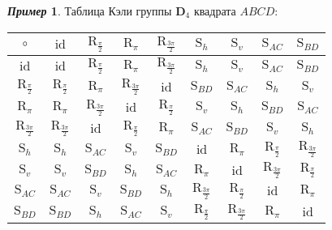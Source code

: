 \documentclass[a4paper, 14pt]{extarticle}
\newcommand{\n}{\par}
\newcommand{\dihedral}{\mathbf{D}}
\newcommand{\id}{\mathrm{id}}
\newcommand{\Rot}{\mathrm{R}}
\newcommand{\Sym}{\mathrm{S}}
\theoremstyle{definition}
\newtheorem*{exmpl*}{\textit{Пример}}
\theoremstyle{plain}
\numberwithin{theorem}{section}
\numberwithin{definition}{section}
\numberwithin{statement}{section}
\numberwithin{lemma}{section}
\numberwithin{consequence}{section}
\begin{document}
	\begin{exmpl*}
		Таблица Кэли группы $\dihedral_4$ квадрата $ABCD{:}$
		\begin{center}
			\begin{tabular}{c|c|c|c|c|c|c|c|c}
				$\circ$ & $\id$ & $\Rot_{\frac{\pi}{2}}$ & $\Rot_{\pi}$ & $\Rot_{\frac{3\pi}{2}}$ & 
				$\Sym_h$ &
				$\Sym_v$ &
				$\Sym_{AC}$ &
				$\Sym_{BD}$ \\
				\hline
				$\id$ & $\id$ & $\Rot_{\frac{\pi}{2}}$ & $\Rot_{\pi}$ & $\Rot_{\frac{3\pi}{2}}$ & 
				$\Sym_h$ &
				$\Sym_v$ &
				$\Sym_{AC}$ &
				$\Sym_{BD}$ \\
				\hline
				$\Rot_{\frac{\pi}{2}}$ & $\Rot_{\frac{\pi}{2}}$ & $\Rot_{\pi}$ & $\Rot_\frac{3\pi}{2}$ & $\id$ & $\Sym_{BD}$ & $\Sym_{AC}$ & $\Sym_h$ & $\Sym_v$ \\
				\hline
				$\Rot_{\pi}$ & $\Rot_{\pi}$ & $\Rot_\frac{3\pi}{2}$ & $\id$ & $\Rot_\frac{\pi}{2}$ & $\Sym_v$ & $\Sym_h$ & $\Sym_{BD}$ & $\Sym_{AC}$ \\ \hline
				$\Rot_\frac{3\pi}{2}$ & $\Rot_\frac{3\pi}{2}$ & $\id$ & $\Rot_\frac{\pi}{2}$ & $\Rot_{\pi}$ & $\Sym_{AC}$ & $\Sym_{BD}$ & $\Sym_v$ & $\Sym_h$ \\
				\hline
				$\Sym_h$ & $\Sym_h$ & $\Sym_{AC}$ & $\Sym_v$ & $\Sym_{BD}$ & $\id$ & $\Rot_{\pi}$ & $\Rot_\frac{\pi}{2}$ & $\Rot_\frac{3\pi}{2}$
				\\
				\hline
				$\Sym_v$ & $\Sym_v$ & $\Sym_{BD}$ & $\Sym_h$ & $\Sym_{AC}$ & $\Rot_{\pi}$ & $\id$ & $\Rot_\frac{3\pi}{2}$ & $\Rot_\frac{\pi}{2}$
				\\
				\hline
				$\Sym_{AC}$ & $\Sym_{AC}$ & $\Sym_v$ & $\Sym_{BD}$ & $\Sym_h$ & $\Rot_\frac{3\pi}{2}$ & $\Rot_\frac{\pi}{2}$ & $\id$ & $\Rot_{\pi}$
				\\
				\hline
				$\Sym_{BD}$ & $\Sym_{BD}$ & $\Sym_h$ & $\Sym_{AC}$ & $\Sym_v$ & $\Rot_\frac{\pi}{2}$ & $\Rot_\frac{3\pi}{2}$ & $\Rot_{\pi}$ & $\id$\\
			\end{tabular}
		\end{center} \n
	\end{exmpl*}
	\newpage
\end{document}
